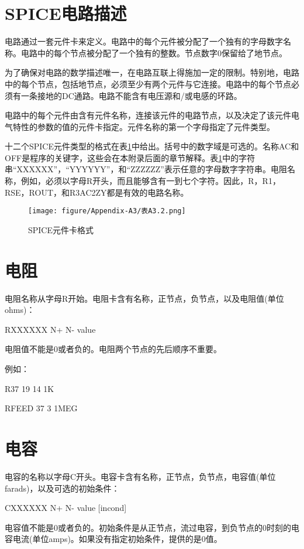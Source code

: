 \section{SPICE电路描述}
电路通过一套元件卡来定义。电路中的每个元件被分配了一个独有的字母数字名称。电路中的每个节点被分配了一个独有的整数。节点数字0保留给了地节点。

为了确保对电路的数学描述唯一，在电路互联上得施加一定的限制。特别地，电路中的每个节点，包括地节点，必须至少有两个元件与它连接。电路中的每个节点必须有一条接地的DC通路。电路不能含有电压源和/或电感的环路。

电路中的每个元件由含有元件名称，连接该元件的电路节点，以及决定了该元件电气特性的参数的值的元件卡指定。元件名称的第一个字母指定了元件类型。

十二个SPICE元件类型的格式在表\ref{表A3.2}中给出。括号中的数字域是可选的。名称AC和OFF是程序的关键字，这些会在本附录后面的章节解释。表\ref{表A3.2}中的字符串“XXXXXX”，“YYYYYY”，和“ZZZZZZ”表示任意的字母数字字符串。电阻名称，例如，必须以字母R开头，而且能够含有一到七个字符。因此，R，R1，RSE，ROUT，和R3AC2ZY都是有效的电路名称。

\begin{figure}[htbp]
\small
    \centering
    \texttt{[image: figure/Appendix-A3/表A3.2.png]}
    \caption{SPICE元件卡格式}
    \label{表A3.2}
\end{figure}

\section{电阻}
电阻名称从字母R开始。电阻卡含有名称，正节点，负节点，以及电阻值(单位ohms)：

RXXXXXX N+ N- value

电阻值不能是0或者负的。电阻两个节点的先后顺序不重要。

例如：

R37 19 14 1K    

RFEED 37 3 1MEG

\section{电容}
电容的名称以字母C开头。电容卡含有名称，正节点，负节点，电容值(单位farads)，以及可选的初始条件：

CXXXXXX N+ N- value [incond]

电容值不能是0或者负的。初始条件是从正节点，流过电容，到负节点的0时刻的电容电流(单位amps)。如果没有指定初始条件，提供的是0值。

